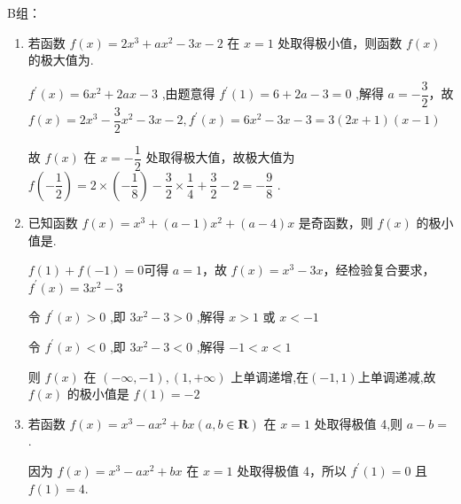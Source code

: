B组：
\begin{enumerate}
    \item 若函数 $f\left( x\right)  = 2{x}^{3} + a{x}^{2} - {3x} - 2$ 在 $x = 1$ 处取得极小值，则函数 $f\left( x\right)$ 的极大值为.
    \begin{jieda}
         ${f}^{\prime }\left( x\right)  = 6{x}^{2} + {2ax} - 3$ ,由题意得 ${f}^{\prime }\left( 1\right)  = 6 + {2a} - 3 = 0$ ,解得 $a =  - \dfrac{3}{2}$，故 $f\left( x\right)  = 2{x}^{3} - \dfrac{3}{2}{x}^{2} - {3x} - 2,{f}^{\prime }\left( x\right)  = 6{x}^{2} - {3x} - 3 = 3\left( {{2x} + 1}\right) \left( {x - 1}\right)$ 
         故 $f\left( x\right)$ 在 $x =  - \dfrac{1}{2}$ 处取得极大值，故极大值为 $f\left( {-\dfrac{1}{2}}\right)  = 2 \times  \left( {-\dfrac{1}{8}}\right)  - \dfrac{3}{2} \times  \dfrac{1}{4} + \dfrac{3}{2} - 2 =  - \dfrac{9}{8}$ .
    \end{jieda}
    
    \item 已知函数 $f\left( x\right)  = {x}^{3} + \left( {a - 1}\right) {x}^{2} + \left( {a - 4}\right) x$ 是奇函数，则 $f\left( x\right)$ 的极小值是.
    \begin{jieda}
        $f(1) + f(-1) = 0$可得 $a = 1$，故 $f\left( x\right)  = {x}^{3} - {3x}$，经检验复合要求，${f}^{\prime }\left( x\right)  = 3{x}^{2} - 3$
        
        令 ${f}^{\prime }\left( x\right)  > 0$ ,即 $3{x}^{2} - 3 > 0$ ,解得 $x > 1$ 或 $x <  - 1$
        
        令 ${f}^{\prime }\left( x\right)  < 0$ ,即 $3{x}^{2} - 3 < 0$ ,解得 $- 1 < x < 1$
        
        则 $f\left( x\right)$ 在 $\left( {-\infty , - 1}\right) ,\left( {1, + \infty }\right)$ 上单调递增,在$(-1,1)$上单调递减,故 $f\left( x\right)$ 的极小值是 $f\left( 1\right)  =  - 2$
    \end{jieda}

    \item 若函数 $f\left( x\right)  = {x}^{3} - a{x}^{2} + {bx}\left( {a,b \in  \mathbf{R}}\right)$ 在 $x = 1$ 处取得极值 4,则 $a - b =$ .
    \begin{jieda}
        因为 $f\left( x\right)  = {x}^{3} - a{x}^{2} + {bx}$ 在 $x = 1$ 处取得极值 4，所以 ${f}^{\prime }\left( 1\right)  = 0$ 且 $f\left( 1\right)  = 4$.
        

\end{jieda}
\end{enumerate}
